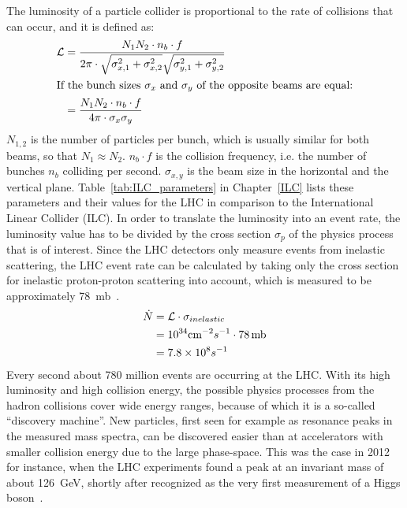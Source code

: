 The luminosity of a particle collider is proportional to the rate of collisions that can occur, and it is defined as:
\begin{align}
 \mathcal{L}&=\frac{N_1N_2 \cdot n_b \cdot f}{2\pi \cdot \sqrt{\sigma^2_{x,1}+\sigma^2_{x,2}} \sqrt{\sigma^2_{y,1}+\sigma^2_{y,2}}}\\
 \intertext{If the bunch sizes $\sigma_x$ and $\sigma_y$ of the opposite beams are equal:}
 &=\frac{N_1N_2 \cdot n_b \cdot f}{4\pi \cdot \sigma_x \sigma_y}
 \label{eq:luminosity}
\end{align}
$N_{1,2}$ is the number of particles per bunch, which is usually similar for both beams, so that $N_1\approx N_2$.
$n_{b}\cdot f$ is the collision frequency, i.e. the number of bunches $n_{b}$ colliding per second.
$\sigma_{x,y}$ is the beam size in the horizontal and the vertical plane.
Table~\ref{tab:ILC_parameters} in Chapter~\ref{ILC} lists these parameters and their values for the LHC in comparison to the International Linear Collider (ILC).
In order to translate the luminosity into an event rate, the luminosity value has to be divided by the cross section $\sigma_p$ of the physics process that is of interest.
Since the LHC detectors only measure events from inelastic scattering, the LHC event rate can be calculated by taking only the cross section for inelastic proton-proton scattering into account, which is measured to be approximately \SI{78}{\milli\barn}~\cite{inelXSection}.
\begin{align}
 \dot{N}&=\mathcal{L}\cdot\sigma_{inelastic}\\
 &=10^{34} \textrm{cm}^{-2}s^{-1} \cdot 78\textrm{\,mb}\\
 &=7.8\times 10^8 s^{-1}
\end{align}
Every second about 780 million events are occurring at the LHC.
With its high luminosity and high collision energy, the possible physics processes from the hadron collisions cover wide energy ranges, because of which it is a so-called ``discovery machine''.
New particles, first seen for example as resonance peaks in the measured mass spectra, can be discovered easier than at accelerators with smaller collision energy due to the large phase-space.
This was the case in 2012 for instance, when the LHC experiments found a peak at an invariant mass of about \SI{126}{\GeV}, shortly after recognized as the very first measurement of a Higgs boson~\cite{Higgs,Higgs2}.\\
